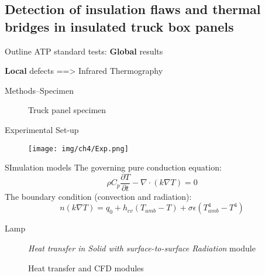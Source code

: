 \subsection{Detection of insulation flaws and thermal bridges in insulated truck box panels}

\begin{frame}{Outline}
    ATP standard tests: \textbf{Global} results

    \textbf{Local} defects ==> \alert{Infrared Thermography}
\end{frame}


\begin{frame}{Methods--Specimen}
    \begin{figure}[ht]
    \hspace*{-20pt}
    \pause
    \caption{Truck panel specimen}
    \end{figure}
 
\end{frame}


\begin{frame}{Experimental Set-up}
    \begin{figure}[ht]
        \centering
        \texttt{[image: img/ch4/Exp.png]}
    \end{figure}
\end{frame}

\begin{frame}{SImulation models}
 The governing pure conduction equation:
    \begin{equation*}
        \rho C_p \frac{\partial T}{\partial t}-\nabla \cdot (k\nabla T) = 0
    \end{equation*}
The boundary condition (convection and radiation):
    \begin{equation*}
        n(k\nabla T) = q_0 + h_{cv}(T_{amb}-T)+\sigma \epsilon(T_{amb}^4-T^4)
    \end{equation*}
\pause
    \begin{description}
        \item[Lamp {\color{red}{Heating}}] \textit{Heat transfer in Solid with surface-to-surface Radiation} module  
        \item[{\color{cyan}{Air Cooling}}] Heat transfer and CFD modules    
    \end{description}
\end{frame}

